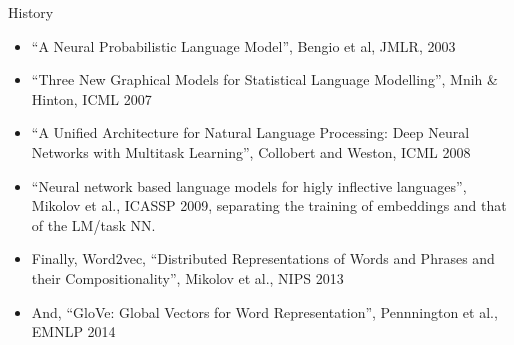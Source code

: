 \documentclass[10pt]{beamer}
\begin{document}
\begin{frame}{History}
\begin{itemize}[<+->]
   \item ``A Neural Probabilistic Language Model'', Bengio et al, JMLR, 2003
   \item ``Three New Graphical Models for Statistical Language Modelling'', Mnih \& Hinton, ICML 2007
   \item ``A Unified Architecture for Natural Language Processing:
Deep Neural Networks with Multitask Learning'', Collobert and Weston, ICML 2008
   \item ``Neural network based language models for higly inflective languages'', Mikolov et al., ICASSP 2009,  separating the training of embeddings and that of the LM/task NN. 
   \item Finally, Word2vec, ``Distributed Representations of Words and Phrases and their Compositionality'', Mikolov et al., NIPS 2013
   \item And, ``GloVe: Global Vectors for Word Representation'', Pennnington et al., EMNLP 2014 
 \end{itemize}
\end{frame}
\end{document}
